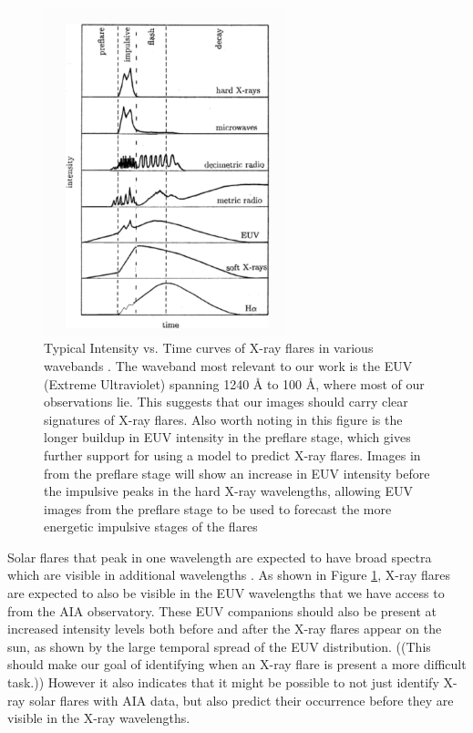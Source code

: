 \documentclass[12pt, letterpaper]{article}
\begin{document}
\begin{figure}[!hb] %
	\centering
	\includegraphics[width=7cm]{figures/spectra_expected.png}
    \caption{Typical Intensity vs. Time curves of X-ray flares in various wavebands \cite{Benz2008}. The waveband most relevant to our work is the EUV (Extreme Ultraviolet) spanning 1240 \AA{} to 100 \AA{}, where most of our observations lie. This suggests that our images should carry clear signatures of X-ray flares. Also worth noting in this figure is the longer buildup in EUV intensity in the preflare stage, which gives further support for using a model to predict X-ray flares. Images in from the preflare stage will show an increase in EUV intensity before the impulsive peaks in the hard X-ray wavelengths, allowing EUV images from the preflare stage to be used to forecast the more energetic impulsive stages of the flares}
    \label{spectral_dist}
\end{figure}

Solar flares that peak in one wavelength are expected to have broad spectra which are visible in additional wavelengths \cite{Benz2008}. As shown in Figure \ref{spectral_dist}, X-ray flares are expected to also be visible in the EUV wavelengths that we have access to from the AIA observatory. These EUV companions should also be present at increased intensity levels both before and after the X-ray flares appear on the sun, as shown by the large temporal spread of the EUV distribution. ((This should make our goal of identifying when an X-ray flare is present a more difficult task.)) However it also indicates that it might be possible to not just identify X-ray solar flares with AIA data, but also predict their occurrence before they are visible in the X-ray wavelengths.
\end{document}
